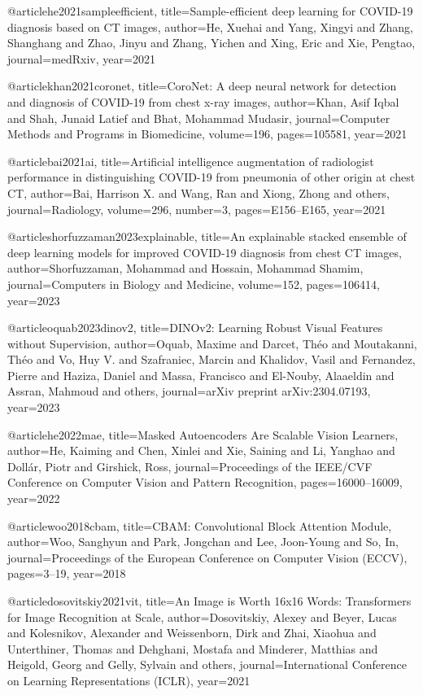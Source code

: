 @article{he2021sampleefficient,
  title={Sample-efficient deep learning for COVID-19 diagnosis based on CT images},
  author={He, Xuehai and Yang, Xingyi and Zhang, Shanghang and Zhao, Jinyu and Zhang, Yichen and Xing, Eric and Xie, Pengtao},
  journal={medRxiv},
  year={2021}
}

@article{khan2021coronet,
  title={CoroNet: A deep neural network for detection and diagnosis of COVID-19 from chest x-ray images},
  author={Khan, Asif Iqbal and Shah, Junaid Latief and Bhat, Mohammad Mudasir},
  journal={Computer Methods and Programs in Biomedicine},
  volume={196},
  pages={105581},
  year={2021}
}

@article{bai2021ai,
  title={Artificial intelligence augmentation of radiologist performance in distinguishing COVID-19 from pneumonia of other origin at chest CT},
  author={Bai, Harrison X. and Wang, Ran and Xiong, Zhong and others},
  journal={Radiology},
  volume={296},
  number={3},
  pages={E156--E165},
  year={2021}
}

@article{shorfuzzaman2023explainable,
  title={An explainable stacked ensemble of deep learning models for improved COVID-19 diagnosis from chest CT images},
  author={Shorfuzzaman, Mohammad and Hossain, Mohammad Shamim},
  journal={Computers in Biology and Medicine},
  volume={152},
  pages={106414},
  year={2023}
}

@article{oquab2023dinov2,
  title={DINOv2: Learning Robust Visual Features without Supervision},
  author={Oquab, Maxime and Darcet, Th{\'e}o and Moutakanni, Th{\'e}o and Vo, Huy V. and Szafraniec, Marcin and Khalidov, Vasil and Fernandez, Pierre and Haziza, Daniel and Massa, Francisco and El-Nouby, Alaaeldin and Assran, Mahmoud and others},
  journal={arXiv preprint arXiv:2304.07193},
  year={2023}
}

@article{he2022mae,
  title={Masked Autoencoders Are Scalable Vision Learners},
  author={He, Kaiming and Chen, Xinlei and Xie, Saining and Li, Yanghao and Doll{\'a}r, Piotr and Girshick, Ross},
  journal={Proceedings of the IEEE/CVF Conference on Computer Vision and Pattern Recognition},
  pages={16000--16009},
  year={2022}
}

@article{woo2018cbam,
  title={CBAM: Convolutional Block Attention Module},
  author={Woo, Sanghyun and Park, Jongchan and Lee, Joon-Young and So, In},
  journal={Proceedings of the European Conference on Computer Vision (ECCV)},
  pages={3--19},
  year={2018}
}

@article{dosovitskiy2021vit,
  title={An Image is Worth 16x16 Words: Transformers for Image Recognition at Scale},
  author={Dosovitskiy, Alexey and Beyer, Lucas and Kolesnikov, Alexander and Weissenborn, Dirk and Zhai, Xiaohua and Unterthiner, Thomas and Dehghani, Mostafa and Minderer, Matthias and Heigold, Georg and Gelly, Sylvain and others},
  journal={International Conference on Learning Representations (ICLR)},
  year={2021}
}

